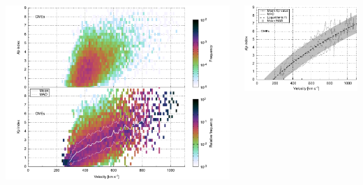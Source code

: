 \documentclass[11pt,aspectratio=1610]{beamer}	%
\newcommand{\captionoftiny}[2]{\captionof{#1}{\color{gray} \tiny #2}}
\begin{document}
\begin{frame}[c]{}{}
	\begin{columns}[c]
		
		\includegraphics[width=\textwidth]{../figures_of_mine/chapter2/Kp_2dhistogram_V_sws1_d.pdf}


		\includegraphics[width=\textwidth]{../figures_of_mine/chapter2/Kp_2dhistogram_V_sws1_fit_e.pdf}
	
	\end{columns}
\end{frame}
\end{document}
